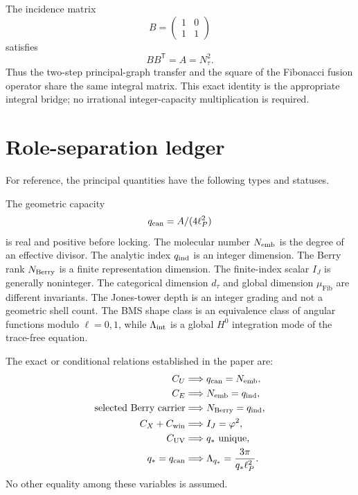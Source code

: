 \documentclass[aps,prd,preprint,nofootinbib,superscriptaddress]{revtex4-2}
\theoremstyle{definition}
\theoremstyle{remark}
\newcommand{\UV}{\mathrm{UV}}
\newcommand{\Fib}{\mathrm{Fib}}
\begin{document}
The incidence matrix
\begin{equation}
B=
\begin{pmatrix}
1&0\\
1&1
\end{pmatrix}
\end{equation}
satisfies
\begin{equation}
BB^{\mathsf T}=A=N_\tau^2.
\end{equation}
Thus the two-step principal-graph transfer and the square of the Fibonacci
fusion operator share the same integral matrix.  This exact identity is the
appropriate integral bridge; no irrational integer-capacity multiplication is
required.

\section{Role-separation ledger}
\label{app:types}

For reference, the principal quantities have the following types and statuses.

The geometric capacity
\begin{equation}
q_{\rm can}=A/(4\ell_P^2)
\end{equation}
is real and positive before locking.  The molecular number
$N_{\rm emb}$ is the degree of an effective divisor.  The analytic index
$q_{\rm ind}$ is an integer dimension.  The Berry rank $N_{\rm Berry}$ is a
finite representation dimension.  The finite-index scalar $I_J$ is generally
noninteger.  The categorical dimension $d_\tau$ and global dimension
$\mu_{\Fib}$ are different invariants.  The Jones-tower depth is an integer
grading and not a geometric shell count.  The BMS shape class is an
equivalence class of angular functions modulo $\ell=0,1$, while
$\Lambda_{\rm int}$ is a global $H^0$ integration mode of the trace-free
equation.

The exact or conditional relations established in the paper are:
\begin{align}
C_U
&\Longrightarrow
q_{\rm can}=N_{\rm emb},
\\
C_E
&\Longrightarrow
N_{\rm emb}=q_{\rm ind},
\\
\text{selected Berry carrier}
&\Longrightarrow
N_{\rm Berry}=q_{\rm ind},
\\
C_X+C_{\rm win}
&\Longrightarrow
I_J=\varphi^2,
\\
C_{\UV}
&\Longrightarrow
q_*\ {\rm unique},
\\
q_*=q_{\rm can}
&\Longrightarrow
\Lambda_{q_*}=\frac{3\pi}{q_*\ell_P^2}.
\end{align}
No other equality among these variables is assumed.
\end{document}
